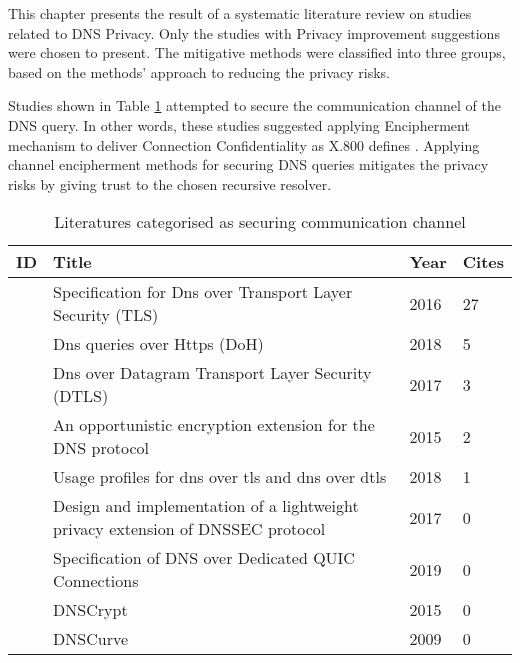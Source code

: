 This chapter presents the result of a systematic literature review on studies related to DNS Privacy. Only the studies with Privacy improvement suggestions were chosen to present.
The mitigative methods were classified into three groups, based on the methods' approach to reducing the privacy risks.

Studies shown in Table \ref{channel} attempted to secure the communication channel of the DNS query.
In other words, these studies suggested applying Encipherment mechanism to deliver Connection Confidentiality as X.800 defines \cite{x800}.
Applying channel encipherment methods for securing DNS queries mitigates the privacy risks by giving trust to the chosen recursive resolver.

\begin{table}[h!]
    \begin{tabular}{ | l | p{10.5cm} | l | l | }
        \hline
            ID & Title & Year & Cites  \\ \hline
            \cite{hu2016specification} & Specification for Dns over Transport Layer Security (TLS) & 2016 & 27 \\ \hline
            \cite{rfc8484} & Dns queries over Https (DoH) & 2018 & 5\\ \hline
            \cite{rfc8094} & Dns over Datagram Transport Layer Security (DTLS) & 2017 & 3\\ \hline
            \cite{bucuti2015opportunistic} & An opportunistic encryption extension for the DNS protocol & 2015 & 2 \\ \hline
            \cite{dickinson2018usage} & Usage profiles for dns over tls and dns over dtls & 2018 & 1 \\ \hline
            \cite{saraj2017design} & Design and implementation of a lightweight privacy extension of DNSSEC protocol & 2017 & 0 \\ \hline
            \cite{dnsoquic} & Specification of DNS over Dedicated QUIC Connections & 2019 & 0 \\ \hline
            \cite{denis2015dnscrypt} & DNSCrypt & 2015 & 0 \\ \hline
            \cite{dempsky2010dnscurve} & DNSCurve & 2009 & 0 \\ \hline
        \end{tabular}
        \caption{Literatures categorised as securing communication channel}
\label{channel}
\end{table}

